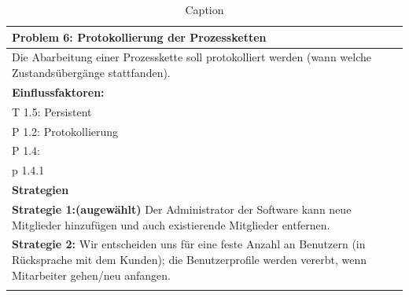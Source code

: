 \documentclass[enabledeprecatedfontcommands,fontsize=12pt,paper=a4,twoside]{scrartcl}
\begin{document}
\begin{table}[]
    \centering
    \begin{tabular}{|p{15cm}|}
    \hline
          \textbf{Problem 6:} Protokollierung der Prozessketten
          \\ \hline
          Die Abarbeitung einer Prozesskette soll protokolliert werden (wann welche Zustandsübergänge stattfanden).
          \\ \hline
          \textbf{Einflussfaktoren: } \\
          T 1.5: Persistent \\
          P 1.2: Protokollierung\\
          P 1.4:\\
          p 1.4.1\\

          \hline
          \textbf{Strategien} \\ \hline
          \textbf{Strategie 1:(augewählt)} Der Administrator der Software kann neue Mitglieder hinzufügen und auch existierende Mitglieder entfernen. \\
	  \textbf{Strategie 2:} Wir entscheiden uns für eine feste Anzahl an Benutzern (in Rücksprache mit dem Kunden); die Benutzerprofile werden vererbt, wenn Mitarbeiter gehen/neu anfangen. \\
          \\ \hline
    \end{tabular}

    \caption{Caption}
    \label{tab:my_label}
\end{table}


\end{document}
